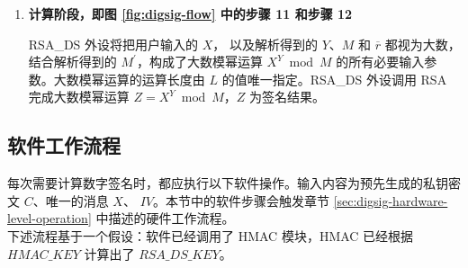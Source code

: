 \documentclass[main\_\_CN.tex]{subfiles}
\begin{document}
\begin{enumerate}
    \item {\bfseries 计算阶段，即图 \ref{fig:digsig-flow} 中的步骤 11 和步骤 12}
    
        RSA\_DS 外设将把用户输入的 \begin{math}X\end{math}，
        以及解析得到的 \begin{math}Y\end{math}、\begin{math}M\end{math} 和 \begin{math}\overline{r}\end{math} 都视为大数，结合解析得到的 \begin{math}M^{\prime}\end{math}，构成了大数模幂运算 \begin{math} X^{Y} \bmod M\end{math} 的所有必要输入参数。大数模幂运算的运算长度由 \begin{math}L\end{math} 的值唯一指定。RSA\_DS 外设调用 RSA 完成大数模幂运算 \begin{math}Z = X^{Y} \bmod M\end{math}，\begin{math}Z\end{math} 为签名结果。

\end{enumerate}


\subsection{软件工作流程}

每次需要计算数字签名时，都应执行以下软件操作。输入内容为预先生成的私钥密文 \begin{math}C\end{math}、唯一的消息 \begin{math}X\end{math}、 \begin{math}IV\end{math}。本节中的软件步骤会触发章节 \ref{sec:digsig-hardware-level-operation} 中描述的硬件工作流程。\\
下述流程基于一个假设：软件已经调用了 HMAC 模块，HMAC 已经根据 \begin{math}HMAC\_KEY\end{math} 计算出了 \begin{math}RSA\_DS\_KEY\end{math}。
\end{document}

